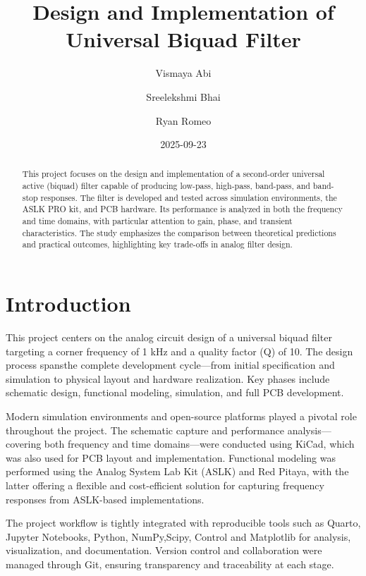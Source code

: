\documentclass[
  letterpaper,
  DIV=11,
  numbers=noendperiod]{scrreprt}
\title{Design and Implementation of Universal Biquad Filter}
\author{Vismaya Abi \and Sreelekshmi Bhai \and Ryan Romeo}
\date{2025-09-23}
\renewcommand*\contentsname{Table of contents}
\newcommand\contentsname{Table of contents}
\begin{document}
\maketitle
\begin{abstract}
This project focuses on the design and implementation of a second-order
universal active (biquad) filter capable of producing low-pass,
high-pass, band-pass, and band-stop responses. The filter is developed
and tested across simulation environments, the ASLK PRO kit, and PCB
hardware. Its performance is analyzed in both the frequency and time
domains, with particular attention to gain, phase, and transient
characteristics. The study emphasizes the comparison between theoretical
predictions and practical outcomes, highlighting key trade-offs in
analog filter design.
\end{abstract}

\renewcommand*\contentsname{Table of contents}
{
\hypersetup{linkcolor=}
\setcounter{tocdepth}{2}
\tableofcontents
}

\chapter{Introduction}\label{introduction}

This project centers on the analog circuit design of a universal biquad
filter targeting a corner frequency of 1 kHz and a quality factor (Q) of
10. The design process spansthe complete development cycle---from
initial specification and simulation to physical layout and hardware
realization. Key phases include schematic design, functional modeling,
simulation, and full PCB development.

Modern simulation environments and open-source platforms played a
pivotal role throughout the project. The schematic capture and
performance analysis---covering both frequency and time domains---were
conducted using KiCad, which was also used for PCB layout and
implementation. Functional modeling was performed using the Analog
System Lab Kit (ASLK) and Red Pitaya, with the latter offering a
flexible and cost-efficient solution for capturing frequency responses
from ASLK-based implementations.

The project workflow is tightly integrated with reproducible tools such
as Quarto, Jupyter Notebooks, Python, NumPy,Scipy, Control and
Matplotlib for analysis, visualization, and documentation. Version
control and collaboration were managed through Git, ensuring
transparency and traceability at each stage.
\end{document}
